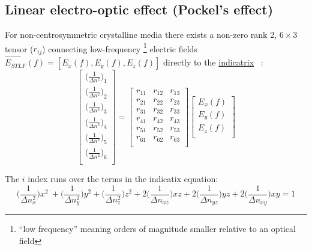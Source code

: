 \subsection{Linear electro-optic effect (Pockel's effect)}
For non-centrosymmetric crystalline media there exists a non-zero rank 2, $6 \times 3$ tensor ($r_{ij}$) connecting low-frequency \footnote{``low frequency'' meaning orders of magnitude smaller relative to an optical field} electric fields $\vec{E_{STLF}}(f) = [E_x(f), E_y(f), E_z(f)]$ directly to the \hyperref[sec:indicatrix]{indicatrix} ~\cite{yariv,nye}:
\begin{equation}
  \left[ {\begin{array}{c}
   \big( \frac{1}{\Delta n ^2 } \big)_1 \\
   \big( \frac{1}{\Delta n ^2 } \big)_2 \\
   \big( \frac{1}{\Delta n ^2 } \big)_3 \\
   \big( \frac{1}{\Delta n ^2 } \big)_4 \\
   \big( \frac{1}{\Delta n ^2 } \big)_5 \\
   \big( \frac{1}{\Delta n ^2 } \big)_6 \\
  \end{array} } \right]
  =
%
 \left[ {\begin{array}{ccc}
   r_{11} & r_{12} & r_{13}\\
   r_{21} & r_{22} & r_{23}\\
   r_{31} & r_{32} & r_{33}\\
   r_{41} & r_{42} & r_{43}\\
   r_{51} & r_{52} & r_{53}\\
   r_{61} & r_{62} & r_{63}\\
  \end{array}} \right]
 \left[{\begin{array}{c}
   E_x (f)\\
   E_y (f)\\
   E_z (f)\\
 \end{array}} \right]
\end{equation}

\noindent The $i$ index runs over the terms in the indicatix equation:
\begin{equation}
\bigg(\frac{1}{\Delta n_x^2} \bigg) x^2\ + \bigg(\frac{1}{\Delta n_y^2} \bigg) y^2 + \bigg(\frac{1}{\Delta n_z^2} \bigg) z^2 + 2 \bigg(\frac{1}{\Delta n_{xz}} \bigg)xz + 2 \bigg(\frac{1}{\Delta n_{yz}} \bigg)yz + 2 \bigg(\frac{1}{\Delta n_{xy}} \bigg)xy = 1
\end{equation}

